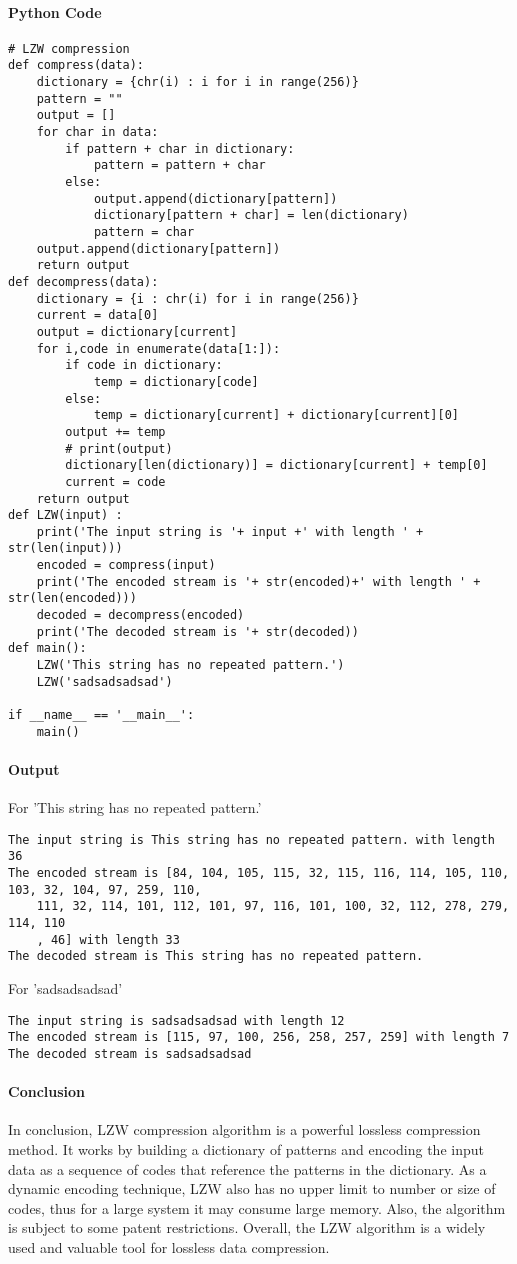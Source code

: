\documentclass[12pt]{article}
\begin{document}
\paragraph{Python Code}
\begin{verbatim}
# LZW compression
def compress(data):
    dictionary = {chr(i) : i for i in range(256)}
    pattern = ""
    output = []
    for char in data:
        if pattern + char in dictionary:
            pattern = pattern + char
        else:
            output.append(dictionary[pattern])
            dictionary[pattern + char] = len(dictionary)
            pattern = char      
    output.append(dictionary[pattern])
    return output
def decompress(data):
    dictionary = {i : chr(i) for i in range(256)}
    current = data[0]
    output = dictionary[current]
    for i,code in enumerate(data[1:]):
        if code in dictionary:
            temp = dictionary[code]
        else:
            temp = dictionary[current] + dictionary[current][0]
        output += temp
        # print(output)
        dictionary[len(dictionary)] = dictionary[current] + temp[0]
        current = code
    return output
def LZW(input) :
    print('The input string is '+ input +' with length ' + str(len(input)))
    encoded = compress(input)
    print('The encoded stream is '+ str(encoded)+' with length ' + str(len(encoded)))
    decoded = decompress(encoded)
    print('The decoded stream is '+ str(decoded))
def main():
    LZW('This string has no repeated pattern.')
    LZW('sadsadsadsad')
    
if __name__ == '__main__':
    main()
\end{verbatim}
\paragraph{Output}
For 'This string has no repeated pattern.'
\begin{verbatim}
The input string is This string has no repeated pattern. with length 36
The encoded stream is [84, 104, 105, 115, 32, 115, 116, 114, 105, 110, 103, 32, 104, 97, 259, 110, 
    111, 32, 114, 101, 112, 101, 97, 116, 101, 100, 32, 112, 278, 279, 114, 110
    , 46] with length 33
The decoded stream is This string has no repeated pattern.
\end{verbatim}
For 'sadsadsadsad'
\begin{verbatim}
The input string is sadsadsadsad with length 12
The encoded stream is [115, 97, 100, 256, 258, 257, 259] with length 7
The decoded stream is sadsadsadsad
\end{verbatim}
\paragraph{Conclusion\\}
In conclusion, LZW compression algorithm is a powerful lossless compression method. 
It works by building a dictionary of patterns and encoding the input data as a sequence of codes that reference the patterns in the dictionary. 
As a dynamic encoding technique, LZW also has no upper limit to number or size of codes, thus for a large system it may consume large memory.
Also, the algorithm is subject to some patent restrictions. 
Overall, the LZW algorithm is a widely used and valuable tool for lossless data compression.
\end{document}

